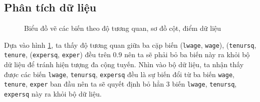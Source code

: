\subsection*{Phân tích dữ liệu}
\begin{figure}[H]
	\centering
	 \hfill
	\caption{Biểu đồ vẽ các biến theo độ tương quan, sơ đồ cột, điểm dữ liệu}
	\label{plot_data4}
\end{figure}

Dựa vào hình \ref{plot_data4}, ta thấy độ tương quan giữa ba cặp biến (\texttt{lwage}, \texttt{wage}), (\texttt{tenursq}, \texttt{tenure}, (\texttt{expersq}, \texttt{exper}) đều trên $0.9$ nên ta sẽ phải bỏ ba biến này ra khỏi bộ dữ liệu để tránh hiện tượng đa cộng tuyến. Nhìn vào bộ dữ liệu, ta nhận thấy được các biến 
\texttt{lwage}, \texttt{tenursq}, \texttt{expersq} đều là sự biến đổi từ ba biến \texttt{wage}, \texttt{tenure}, \texttt{exper} ban đầu nên ta sẽ quyết định bỏ hẳn 3 biến \texttt{lwage}, \texttt{tenursq}, \texttt{expersq} này ra khỏi bộ dữ liệu.

